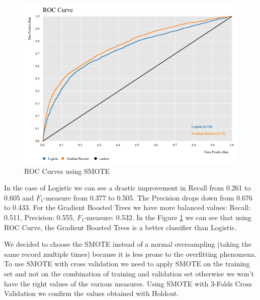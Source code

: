 \documentclass[fleqn,10pt]{SelfArx} %
\begin{document}
\begin{figure}[h!]
	\includegraphics[width=\linewidth]{ROC_SMOTE.png}
	\caption{ROC Curves using SMOTE}
	\label{fig:SMOTE_ROC}
\end{figure} 

In the case of Logistic we can see a drastic improvement in Recall from 0.261 to 0.605 and $F_1$-measure from 0.377 to 0.505. The Precision drops down from 0.676 to 0.433. \newline
For the Gradient Boosted Trees we have more balanced values: Recall: 0.511, Precision: 0.555, $F_1$-measure: 0.532. 
In the Figure \ref{fig:SMOTE_ROC} we can see that using ROC Curve, the Gradient Boosted Trees is a better classifier than Logistic.

We decided to choose the SMOTE instead of a normal oversampling (taking the same record multiple times) because it is less prone to the overfitting phenomena.\newline
To use SMOTE with  cross validation we need to apply SMOTE on the training set and not on the combination of training and validation set otherwise we won't have the right values of the various measures.
Using SMOTE with 3-Folds Cross Validation we confirm the values obtained with Holdout.
\end{document}
